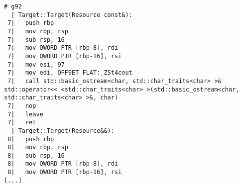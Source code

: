 \begin{lstlisting}[language={},numbers=none,title=\href{https://godbolt.org/z/GL4MHb}{\texttt{godbolt.org/z/GL4MHb}}]
# g92 
  | Target::Target(Resource const&):
 7|   push rbp
 7|   mov rbp, rsp
 7|   sub rsp, 16
 7|   mov QWORD PTR [rbp-8], rdi
 7|   mov QWORD PTR [rbp-16], rsi
 7|   mov esi, 97
 7|   mov edi, OFFSET FLAT:_ZSt4cout
 7|   call std::basic_ostream<char, std::char_traits<char> >& std::operator<< <std::char_traits<char> >(std::basic_ostream<char, std::char_traits<char> >&, char)
 7|   nop
 7|   leave
 7|   ret
  | Target::Target(Resource&&):
 8|   push rbp
 8|   mov rbp, rsp
 8|   sub rsp, 16
 8|   mov QWORD PTR [rbp-8], rdi
 8|   mov QWORD PTR [rbp-16], rsi
[...]
\end{lstlisting}
